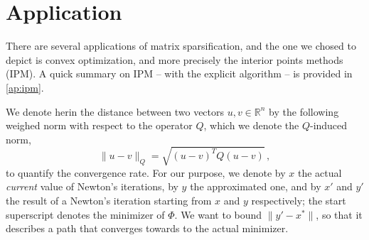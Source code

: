 \section{Application}
There are several applications of matrix sparsification, and the one we chosed
to depict is convex optimization, and more precisely the interior points methods
(IPM). A quick summary on IPM -- with the explicit algorithm -- is provided in
\autoref{ap:ipm}.

We denote herin the distance between two vectors $u, v \in \mathbb R^{n}$ by the
following weighed norm with respect to the operator $Q$, which we denote the
$Q$-induced norm,
\begin{equation}\label{eq:def-h-norm}
\| u - v \|_Q = \sqrt{(u-v)^TQ(u-v)}\, ,
\end{equation}
to quantify the convergence rate. For our purpose, we denote by $x$ the actual
\emph{current} value of Newton's iterations, by $y$ the approximated one, and by
$x'$ and $y'$ the result of a Newton's iteration starting from $x$ and $y$
respectively; the start superscript denotes the minimizer of $\Phi$. We want to
bound $\|y' - x^* \|$, so that it describes a path that converges towards to the
actual minimizer.






